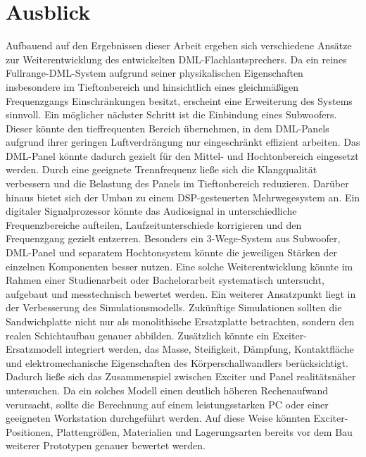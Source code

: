 \chapter{Ausblick}

Aufbauend auf den Ergebnissen dieser Arbeit ergeben sich verschiedene Ansätze zur Weiterentwicklung des entwickelten DML-Flachlautsprechers. Da ein reines Fullrange-DML-System aufgrund seiner physikalischen Eigenschaften insbesondere im Tieftonbereich und hinsichtlich eines gleichmäßigen Frequenzgangs Einschränkungen besitzt, erscheint eine Erweiterung des Systems sinnvoll.
Ein möglicher nächster Schritt ist die Einbindung eines Subwoofers. Dieser könnte den tieffrequenten Bereich übernehmen, in dem DML-Panels aufgrund ihrer geringen Luftverdrängung nur eingeschränkt effizient arbeiten. Das DML-Panel könnte dadurch gezielt für den Mittel- und Hochtonbereich eingesetzt werden. Durch eine geeignete Trennfrequenz ließe sich die Klangqualität verbessern und die Belastung des Panels im Tieftonbereich reduzieren.
Darüber hinaus bietet sich der Umbau zu einem DSP-gesteuerten Mehrwegesystem an. Ein digitaler Signalprozessor könnte das Audiosignal in unterschiedliche Frequenzbereiche aufteilen, Laufzeitunterschiede korrigieren und den Frequenzgang gezielt entzerren. Besonders ein 3-Wege-System aus Subwoofer, DML-Panel und separatem Hochtonsystem könnte die jeweiligen Stärken der einzelnen Komponenten besser nutzen. Eine solche Weiterentwicklung könnte im Rahmen einer Studienarbeit oder Bachelorarbeit systematisch untersucht, aufgebaut und messtechnisch bewertet werden.
Ein weiterer Ansatzpunkt liegt in der Verbesserung des Simulationsmodells. Zukünftige Simulationen sollten die Sandwichplatte nicht nur als monolithische Ersatzplatte betrachten, sondern den realen Schichtaufbau genauer abbilden. Zusätzlich könnte ein Exciter-Ersatzmodell integriert werden, das Masse, Steifigkeit, Dämpfung, Kontaktfläche und elektromechanische Eigenschaften des Körperschallwandlers berücksichtigt. Dadurch ließe sich das Zusammenspiel zwischen Exciter und Panel realitätsnäher untersuchen. Da ein solches Modell einen deutlich höheren Rechenaufwand verursacht, sollte die Berechnung auf einem leistungsstarken PC oder einer geeigneten Workstation durchgeführt werden. Auf diese Weise könnten Exciter-Positionen, Plattengrößen, Materialien und Lagerungsarten bereits vor dem Bau weiterer Prototypen genauer bewertet werden.

